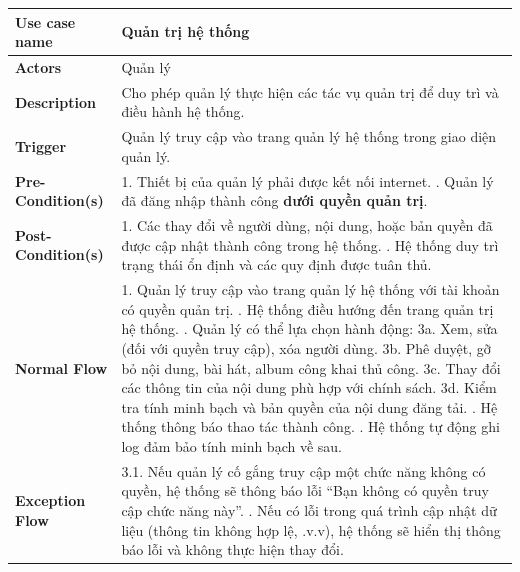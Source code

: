 \documentclass[a4paper]{article}
\newcommand{\cach}{\hspace*{1.5em}\ignorespaces}
\begin{document}
\begin{table}[h!]
\centering
\renewcommand{\arraystretch}{1.3} %
\begin{tabularx}{\textwidth}{|l|X|}
\hline
\textbf{Use case name} & Quản trị hệ thống \\ \hline
\textbf{Actors}        & Quản lý \\ \hline
\textbf{Description}   & Cho phép quản lý thực hiện các tác vụ quản trị để duy trì và điều hành hệ thống. \\ \hline
\textbf{Trigger}       & Quản lý truy cập vào trang quản lý hệ thống trong giao diện quản lý. \\ \hline
\textbf{Pre-Condition(s)} 
& 1. Thiết bị của quản lý phải được kết nối internet. \newline
  2. Quản lý đã đăng nhập thành công \textbf{dưới quyền quản trị}. \\ \hline
\textbf{Post-Condition(s)} 
& 1. Các thay đổi về người dùng, nội dung, hoặc bản quyền đã được cập nhật thành công trong hệ thống. \newline
  2. Hệ thống duy trì trạng thái ổn định và các quy định được tuân thủ. \\ \hline
\textbf{Normal Flow}   
& 1. Quản lý truy cập vào trang quản lý hệ thống với tài khoản có quyền quản trị. \newline
  2. Hệ thống điều hướng đến trang quản trị hệ thống. \newline
  3. Quản lý có thể lựa chọn hành động: \newline
  \cach 3a. Xem, sửa (đối với quyền truy cập), xóa người dùng. \newline
  \cach 3b. Phê duyệt, gỡ bỏ nội dung, bài hát, album công khai thủ công. \newline
  \cach 3c. Thay đổi các thông tin của nội dung phù hợp với chính sách. \newline
  \cach 3d. Kiểm tra tính minh bạch và bản quyền của nội dung đăng tải. \newline
  4. Hệ thống thông báo thao tác thành công. \newline
  5. Hệ thống tự động ghi log đảm bảo tính minh bạch về sau. \\ \hline
\textbf{Exception Flow} 
& 3.1. Nếu quản lý cố gắng truy cập một chức năng không có quyền, hệ thống sẽ thông báo lỗi ``Bạn không có quyền truy cập chức năng này''. \newline
  3.2. Nếu có lỗi trong quá trình cập nhật dữ liệu (thông tin không hợp lệ, .v.v), hệ thống sẽ hiển thị thông báo lỗi và không thực hiện thay đổi. \newline

\end{tabularx}
\end{table}
\end{document}
